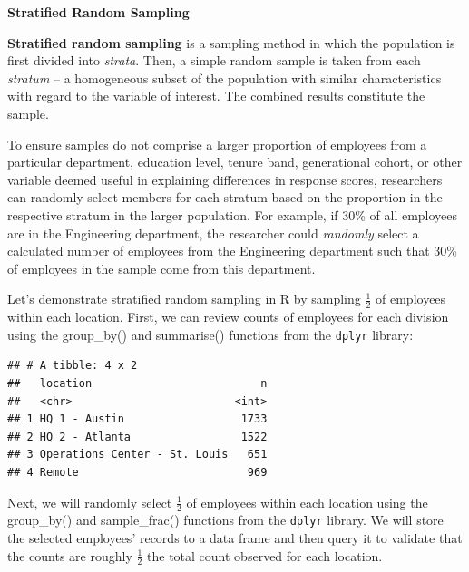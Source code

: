 \documentclass[]{book}
\newenvironment{Shaded}{\begin{snugshade}}{\end{snugshade}}
\newcommand{\CommentTok}[1]{\textcolor[rgb]{0.56,0.35,0.01}{\textit{#1}}}
\newcommand{\DataTypeTok}[1]{\textcolor[rgb]{0.13,0.29,0.53}{#1}}
\newcommand{\KeywordTok}[1]{\textcolor[rgb]{0.13,0.29,0.53}{\textbf{#1}}}
\newcommand{\NormalTok}[1]{#1}
\newcommand{\OperatorTok}[1]{\textcolor[rgb]{0.81,0.36,0.00}{\textbf{#1}}}
\begin{document}
\textbf{Stratified Random Sampling}

\textbf{Stratified random sampling} is a sampling method in which the population is first divided into \emph{strata}. Then, a simple random sample is taken from each \emph{stratum} -- a homogeneous subset of the population with similar characteristics with regard to the variable of interest. The combined results constitute the sample.

To ensure samples do not comprise a larger proportion of employees from a particular department, education level, tenure band, generational cohort, or other variable deemed useful in explaining differences in response scores, researchers can randomly select members for each stratum based on the proportion in the respective stratum in the larger population. For example, if 30\% of all employees are in the Engineering department, the researcher could \emph{randomly} select a calculated number of employees from the Engineering department such that 30\% of employees in the sample come from this department.

Let's demonstrate stratified random sampling in R by sampling \(\frac{1}{2}\) of employees within each location. First, we can review counts of employees for each division using the group\_by() and summarise() functions from the \texttt{dplyr} library:

\begin{Shaded}
\end{Shaded}

\begin{verbatim}
## # A tibble: 4 x 2
##   location                          n
##   <chr>                         <int>
## 1 HQ 1 - Austin                  1733
## 2 HQ 2 - Atlanta                 1522
## 3 Operations Center - St. Louis   651
## 4 Remote                          969
\end{verbatim}

Next, we will randomly select \(\frac{1}{2}\) of employees within each location using the group\_by() and sample\_frac() functions from the \texttt{dplyr} library. We will store the selected employees' records to a data frame and then query it to validate that the counts are roughly \(\frac{1}{2}\) the total count observed for each location.
\end{document}
